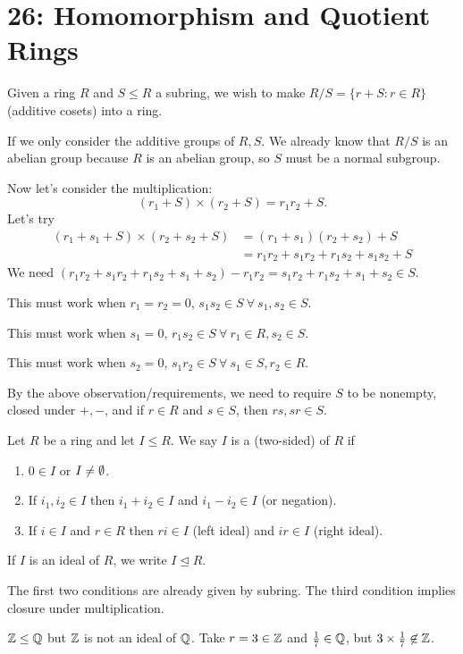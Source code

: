\documentclass[class=article,crop=false]{standalone}
\begin{document}
\section*{26: Homomorphism and Quotient Rings}

Given a ring $ R$ and  $ S \leq R$ a subring, we wish to make  $ R /S = \{r+S: r \in R\} $ (additive cosets) into a ring. 

If we only consider the additive groups of $ R,S$. We already know that $ R /S$ is an abelian group because  $ R$ is an abelian group, so  $ S$ must be a normal subgroup. 

Now let's consider the multiplication:
\[
	(r_1+S)\times (r_2+S) = r_1 r_2 +S
.\] 
Let's try
\begin{align*}
	(r_1+s_1+ S) \times (r_2+s_2+S) &= (r_1+s_1)(r_2+s_2) + S \\
	&= r_1 r_2 + s_1 r_2 + r_1 s_2 + s_1 s_2 +S 
\end{align*}
We need $ (r_1 r_2 + s_1 r_2 + r_1 s_2 + s_1 +s_2)-r_1 r_2 = s_1 r_2 + r_1 s_2 + s_1 + s_2 \in S$.

This must work when $ r_1 = r_2 =0$, $ s_1 s_2 \in S \ \forall \ s_1, s_2 \in S$.

This must work when $ s_1 =0$, $ r_1 s_2 \in S \ \forall \ r_1 \in R, s_2 \in S$.

This must work when $ s_2=0$, $ s_1 r_2 \in S \ \forall \ s_1 \in S, r_2 \in R$.

By the above observation/requirements, we need to require $ S$ to be nonempty, closed under  $ +,-$, and if $ r \in R$ and $ s \in S$, then $ rs, sr \in S$.

\begin{defn}[ideal]
	Let $ R$ be a ring and let  $ I\leq R$. We say  $ I$ is a (two-sided)   of $ R$ if
	 \begin{enumerate}[label=(\roman*)]
		\item $ 0 \in I$ or $ I \neq \emptyset$.
		\item If $ i_1,i_2 \in I$ then $ i_1+i_2 \in I$ and $ i_1 - i_2 \in I$ (or negation).
		\item If $ i \in I$ and $ r \in R$ then $ ri \in I$ (left ideal) and $ ir \in I$ (right ideal).
	\end{enumerate}
	If $ I$ is an ideal of  $ R$, we write  $ I \trianglelefteq R$.
\end{defn}
\begin{note}[]
	The first two conditions are already given by subring. The third condition implies closure under multiplication.
\end{note}
\begin{eg}[]
$ \mathbb{Z} \leq \mathbb{Q}$ but $ \mathbb{Z}$ is not an ideal of $ \mathbb{Q}$. Take $ r=3 \in \mathbb{Z}$ and $ \frac{1}{7} \in \mathbb{Q}$, but $ 3 \times \frac{1}{7} \not\in \mathbb{Z}$.
\end{eg}
\end{document}
